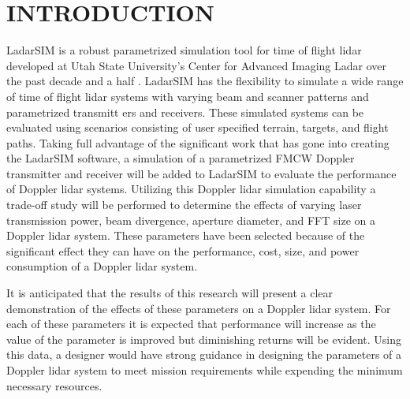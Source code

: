 %
%
%
%

\chapter{INTRODUCTION}
\thispagestyle{empty}

LadarSIM is a robust parametrized simulation tool for time of flight lidar
developed at Utah State University's Center
for Advanced Imaging Ladar over the past decade and a half \cite{budgeLeishman,neilsenBudge}.
LadarSIM has the flexibility to simulate a wide range of time of flight
lidar systems with varying beam and scanner patterns and parametrized transmitt
ers and receivers.
These simulated systems can be evaluated using scenarios consisting of
user specified terrain, targets, and flight paths.
Taking full advantage of the significant work that has gone into creating
the LadarSIM software, a simulation of a parametrized FMCW Doppler transmitter
and receiver will be added to LadarSIM to evaluate the performance of Doppler
lidar systems.
Utilizing this Doppler lidar simulation capability a trade-off study will
be performed to determine the effects of varying laser transmission power,
beam divergence, aperture diameter, and FFT size on a Doppler lidar system.
These parameters have been selected because of the significant effect they
can have on the performance, cost, size, and power consumption of a Doppler
lidar system.

It is anticipated that the results of this research will present a clear
demonstration of the effects of these parameters on a Doppler lidar system.
For each of these parameters it is expected that performance will increase
as the value of the parameter is improved but diminishing returns will
be evident.
Using this data, a designer would have strong guidance in designing the
parameters of a Doppler lidar system to meet mission requirements while
expending the minimum necessary resources.


